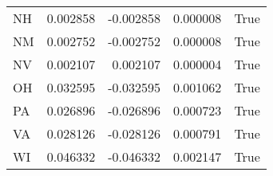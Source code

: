 \begin{table}
\begin{tabular}{lrrrl}
      NH &   0.002858 & -0.002858 &       0.000008 &          True \\
      NM &   0.002752 & -0.002752 &       0.000008 &          True \\
      NV &   0.002107 &  0.002107 &       0.000004 &          True \\
      OH &   0.032595 & -0.032595 &       0.001062 &          True \\
      PA &   0.026896 & -0.026896 &       0.000723 &          True \\
      VA &   0.028126 & -0.028126 &       0.000791 &          True \\
      WI &   0.046332 & -0.046332 &       0.002147 &          True \\
\bottomrule
\end{tabular}
\end{table}
